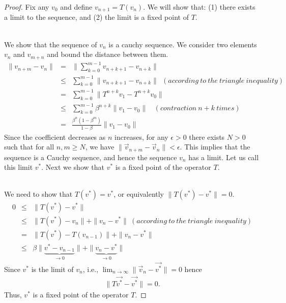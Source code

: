 \begin{proof}
Fix any $v_0$ and define $v_{n+1}=T(v_n)$. We will show that: (1)
there exists a limit to the sequence, and (2) the limit is a fixed
point of $T$.

\bigskip
{}\\
We show that the sequence of $v_n$ is a cauchy sequence. We consider
two elements $v_n$ and $v_{m+n}$ and bound the distance between them.
\begin{eqnarray*}
\|v_{n+m}-v_n\| & = & \|\sum_{k=0}^{m-1}v_{n+k+1}-v_{n+k}\|\\
& \leq & \sum_{k=0}^{m-1}\|v_{n+k+1}-v_{n+k}\| \ \ (according\ to\
the\ triangle\ inequality)\\& = &
\sum_{k=0}^{m-1}\|T^{n+k}v_1-T^{n+k}v_0\|\\ & \leq &
\sum_{k=0}^{m-1}\beta^{n+k}\|v_1-v_0\|\ \ \ \ (contraction\ n+k\
times)\\& = & \frac{\beta^n(1-\beta^m)}{1-\beta}\|v_1-v_0\|
\end{eqnarray*}
Since the coefficient decreases as $n$ increases, for any $ \epsilon
> 0$ there exists   $N
> 0$  such that for all $ n,m \geq N$, we have $\|\vec{v}_{n+m}-\vec{v}_n\| <
\epsilon$. This implies that the sequence is a Cauchy sequence, and
hence the sequence $v_n$ has a limit. Let us call this limit
${v^*}$. Next we show that ${v^*}$ is a fixed point of the operator
$T$.

\bigskip
{}\\
We need to show that $T(v^*)=v^*$, or equivalently
$\|T(v^*)-v^*\|=0$.
\begin{eqnarray*}
0 & \leq & \|T(v^*)-v^*\|\\
& \leq & \|T(v^*)-v_n\|  +  \|v_n-v^*\|\ (according\ to\ the \
triangle\ inequality)\\
& = & \|T(v^*)-T(v_{n-1})\|  +  \|v_n-v^*\|\\
& \leq & \beta\|\underbrace{v^*-v_{n-1}}_{\rightarrow 0 }\|  +
\|\underbrace{v_{n}-v^*}_{\rightarrow 0}\|
\end{eqnarray*}
Since $v^*$ is the limit of $v_n$, i.e.,
$\lim_{n\rightarrow\infty}\|\vec{v}_n-\vec{v^*}\| = 0 $ hence
\begin{eqnarray*}
\|T\vec{v^*}-\vec{v^*}\| = 0.
\end{eqnarray*}
Thus, $v^*$ is a fixed point of the operator $T$.


\end{proof}
